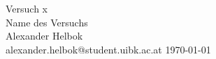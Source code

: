\documentclass{alex_gp}
\begin{document}
	\pagestyle{empty}
	
	\begin{center}
		\LARGE	
		Versuch x \\
		Name des Versuchs\\
		\Large
		Alexander Helbok \\
		alexander.helbok@student.uibk.ac.at
		\today
	\end{center}

	\tableofcontents
	
	
	
\end{document}
